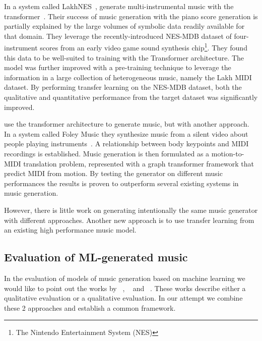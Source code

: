 \documentclass{IEEEtran}
\begin{document}
       In a system called LakhNES~\citeauthor{donahue2019lakhnes},
       generate multi-instrumental music with the transformer~\cite{donahue2019lakhnes}.
       Their success of music generation with the piano score generation is partially
       explained by the large volumes of symbolic data readily available for that domain.
       They leverage the recently-introduced NES-MDB dataset of four-instrument scores
       from an early video game sound synthesis
       chip\footnote{The Nintendo Entertainment System (NES)}.
       They found this data to be well-suited to training with the
       Transformer architecture. The model was further improved with a pre-training
       technique to leverage the information in a large collection of heterogeneous music,
       namely the Lakh MIDI dataset. By performing transfer learning on the NES-MDB dataset,
       both the qualitative and quantitative performance from the target dataset was
       significantly improved.
       
        \citeauthor{gan2020foley} use
        the transformer architecture to generate music, but with another approach.
        In a system called Foley Music they synthesize music from a silent video about
        people playing instruments~\cite{gan2020foley}.
        A relationship between body keypoints and MIDI recordings is established.
        Music generation is then formulated as a motion-to-MIDI translation problem,
        represented with a graph transformer framework that predict MIDI from motion.
        By testing the generator on different music performances the results is proven to outperform several existing systems in music generation.

        However, there is little work on generating intentionally the same music generator
        with different approaches. Another new approach is to use transfer learning from
        an existing high performance music model.

        \subsection{Evaluation of ML-generated music}
        In the evaluation of models of music generation based on machine learning we
        would like to point out the works by \citeauthor{1030094}~\cite{1030094},
        \citeauthor{yang2020evaluation}~\cite{yang2020evaluation}
        and \citeauthor{wu2020jazz}~\cite{wu2020jazz}.
        These works describe either a qualitative evaluation or a qualitative evaluation.
        In our attempt we combine these 2 approaches and establish a common framework.
\end{document}

